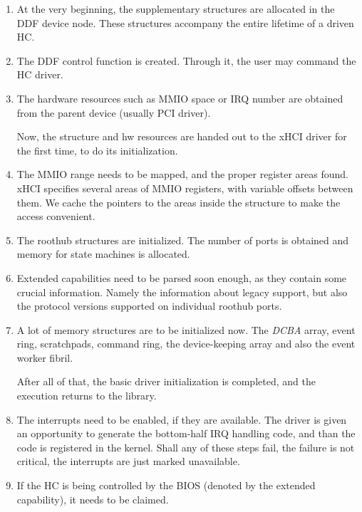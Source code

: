 \begin{enumerate}
\item
	At the very beginning, the supplementary structures are allocated in the
	DDF device node. These structures accompany the entire lifetime of a driven
	HC.

\item
	The DDF control function is created. Through it, the user may command the
	HC driver.

\item
	The hardware resources such as MMIO space or IRQ number are obtained from
	the parent device (usually PCI driver).

	Now, the structure and hw resources are handed out to the xHCI driver for
	the first time, to do its initialization.

\item
	The MMIO range needs to be mapped, and the proper register areas found.
	xHCI specifies several areas of MMIO registers, with variable offsets
	between them. We cache the pointers to the areas inside the
	 structure to make the access convenient.

\item
	The roothub structures are initialized. The number of ports is obtained and
	memory for state machines is allocated.

\item
	Extended capabilities need to be parsed soon enough, as they contain some
	crucial information. Namely the information about legacy support, but also
	the protocol versions supported on individual roothub ports.

\item
	A lot of memory structures are to be initialized now. The \emph{DCBA}
	array, event ring, scratchpads, command ring, the device-keeping array and
	also the event worker fibril.

	After all of that, the basic driver initialization is completed, and the
	execution returns to the library.

\item
	The interrupts need to be enabled, if they are available. The driver is
	given an opportunity to generate the bottom-half IRQ handling code, and
	than the code is registered in the kernel. Shall any of these steps fail,
	the failure is not critical, the interrupts are just marked unavailable.

\item
	If the HC is being controlled by the BIOS (denoted by the extended
	capability), it needs to be claimed.


\end{enumerate}
